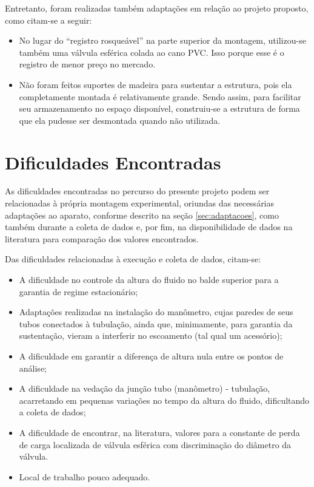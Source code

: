 Entretanto, foram realizadas também adaptações em relação ao projeto proposto,
como citam-se a seguir:
\begin{itemize}
\item No lugar do ``registro rosqueável'' na parte superior da montagem,
utilizou-se também uma válvula esférica colada ao cano PVC. Isso porque esse é o
registro de menor preço no mercado.
\item Não foram feitos suportes de madeira para sustentar a estrutura, pois ela
completamente montada é relativamente grande. Sendo assim, para facilitar seu
armazenamento no espaço disponível, construiu-se a estrutura de forma que ela
pudesse ser desmontada quando não utilizada.
\end{itemize}

\section{Dificuldades Encontradas}%
\label{sec:dificuldades}

As dificuldades encontradas no percurso do presente projeto podem ser
relacionadas à própria montagem experimental, oriundas das necessárias
adaptações ao aparato, conforme descrito na seção \ref{sec:adaptacoes}, como
também durante a coleta de dados e, por fim, na disponibilidade de dados na
literatura para comparação dos valores encontrados.

Das dificuldades relacionadas à execução e coleta de dados, citam-se:
\begin{itemize}
\item A dificuldade no controle da altura do fluido no balde superior para a
garantia de regime estacionário;
\item Adaptações realizadas na instalação do manômetro, cujas paredes de seus
  tubos conectados à tubulação, ainda que, minimamente, para garantia da
  sustentação, vieram a interferir no escoamento (tal qual um acessório);
\item A dificuldade em garantir a diferença de altura nula entre os pontos de
  análise;
\item A dificuldade na vedação da junção tubo (manômetro) - tubulação,
acarretando em pequenas variações no tempo da altura do fluido, dificultando a
coleta de dados;
\item A dificuldade de encontrar, na literatura, valores para a constante de
perda de carga localizada de válvula esférica com discriminação do diâmetro da
válvula.
\item Local de trabalho pouco adequado.
\end{itemize}


